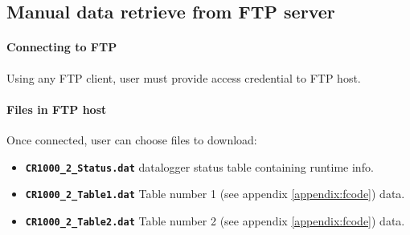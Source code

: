 \subsection{Manual data retrieve from FTP server}
\paragraph{Connecting to FTP}
Using any FTP client, user must provide access credential to FTP host.
\paragraph{Files in FTP host}
Once connected, user can choose files to download:
\begin{itemize}
	\item \texttt{\bfseries CR1000\_2\_Status.dat}    datalogger status table containing runtime info.
	\item \texttt{\bfseries CR1000\_2\_Table1.dat}    Table number 1 (see appendix \ref{appendix:fcode}) data.
	\item \texttt{\bfseries CR1000\_2\_Table2.dat}    Table number 2 (see appendix \ref{appendix:fcode}) data.
\end{itemize}